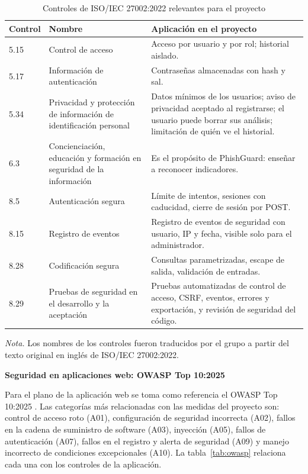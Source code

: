 \documentclass[journal,onecolumn,12pt,draftclsnofoot]{IEEEtran}
\newcommand{\apartado}[1]{\par\medskip\noindent\textbf{#1}\par\smallskip}
\begin{document}
\begin{table}[htbp]
\centering
\caption{Controles de ISO/IEC 27002:2022 relevantes para el proyecto}\label{tab:iso}
\small
\setlength{\tabcolsep}{4pt}
\begin{tabular}{|p{}|p{}|p{}|}
\hline
\textbf{Control} & \textbf{Nombre} & \textbf{Aplicación en el proyecto} \\ \hline
5.15 & Control de acceso & Acceso por usuario y por rol; historial aislado. \\ \hline
5.17 & Información de autenticación & Contraseñas almacenadas con hash y sal. \\ \hline
5.34 & Privacidad y protección de información de identificación personal & Datos mínimos de los usuarios; aviso de privacidad aceptado al registrarse; el usuario puede borrar sus análisis; limitación de quién ve el historial. \\ \hline
6.3 & Concienciación, educación y formación en seguridad de la información & Es el propósito de PhishGuard: enseñar a reconocer indicadores. \\ \hline
8.5 & Autenticación segura & Límite de intentos, sesiones con caducidad, cierre de sesión por POST. \\ \hline
8.15 & Registro de eventos & Registro de eventos de seguridad con usuario, IP y fecha, visible solo para el administrador. \\ \hline
8.28 & Codificación segura & Consultas parametrizadas, escape de salida, validación de entradas. \\ \hline
8.29 & Pruebas de seguridad en el desarrollo y la aceptación & Pruebas automatizadas de control de acceso, CSRF, eventos, errores y exportación, y revisión de seguridad del código. \\ \hline
\end{tabular}
\end{table}

\noindent\footnotesize\textit{Nota.} Los nombres de los controles fueron traducidos por el grupo a partir del texto original en inglés de ISO/IEC 27002:2022.\normalsize

\apartado{Seguridad en aplicaciones web: OWASP Top 10:2025}

Para el plano de la aplicación web se toma como referencia el OWASP Top 10:2025 \cite{owasp}. Las categorías más relacionadas con las medidas del proyecto son: control de acceso roto (A01), configuración de seguridad incorrecta (A02), fallos en la cadena de suministro de software (A03), inyección (A05), fallos de autenticación (A07), fallos en el registro y alerta de seguridad (A09) y manejo incorrecto de condiciones excepcionales (A10). La tabla~\ref{tab:owasp} relaciona cada una con los controles de la aplicación.
\end{document}

